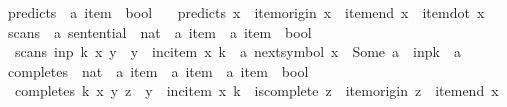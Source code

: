 %
\begin{isabellebody}%
%
%
\isadelimtheory
%
\endisadelimtheory
%
\isatagtheory
%
\endisatagtheory
{\isafoldtheory}%
%
\isadelimtheory
%
\endisadelimtheory
%
\isadelimdocument
%
\endisadelimdocument
%
\isatagdocument
%
\isamarkuptrue%
%
\isamarkuptrue%
%
\isamarkuptrue%
%
\endisatagdocument
{\isafolddocument}%
%
\isadelimdocument
%
\endisadelimdocument
{}\isamarkupfalse%
\ predicts\ {\isacharcolon}{\kern0pt}{\isacharcolon}{\kern0pt}\ {\isachardoublequoteopen}{\isacharprime}{\kern0pt}a\ item\ {\isasymRightarrow}\ bool{\isachardoublequoteclose}\ \isanewline
\ \ {\isachardoublequoteopen}predicts\ x\ {\isasymequiv}\ item{\isacharunderscore}{\kern0pt}origin\ x\ {\isacharequal}{\kern0pt}\ item{\isacharunderscore}{\kern0pt}end\ x\ {\isasymand}\ item{\isacharunderscore}{\kern0pt}dot\ x\ {\isacharequal}{\kern0pt}\ {}{\isachardoublequoteclose}\isanewline
\isanewline
{}\isamarkupfalse%
\ scans\ {\isacharcolon}{\kern0pt}{\isacharcolon}{\kern0pt}\ {\isachardoublequoteopen}{\isacharprime}{\kern0pt}a\ sentential\ {\isasymRightarrow}\ nat\ {\isasymRightarrow}\ {\isacharprime}{\kern0pt}a\ item\ {\isasymRightarrow}\ {\isacharprime}{\kern0pt}a\ item\ {\isasymRightarrow}\ bool{\isachardoublequoteclose}\ \isanewline
\ \ {\isachardoublequoteopen}scans\ inp\ k\ x\ y\ {\isasymequiv}\ y\ {\isacharequal}{\kern0pt}\ inc{\isacharunderscore}{\kern0pt}item\ x\ k\ {\isasymand}\ {\isacharparenleft}{\kern0pt}{\isasymexists}a{\isachardot}{\kern0pt}\ next{\isacharunderscore}{\kern0pt}symbol\ x\ {\isacharequal}{\kern0pt}\ Some\ a\ {\isasymand}\ inp{\isacharbang}{\kern0pt}{\isacharparenleft}{\kern0pt}k{\isacharminus}{\kern0pt}{}{\isacharparenright}{\kern0pt}\ {\isacharequal}{\kern0pt}\ a{\isacharparenright}{\kern0pt}{\isachardoublequoteclose}\isanewline
\isanewline
{}\isamarkupfalse%
\ completes\ {\isacharcolon}{\kern0pt}{\isacharcolon}{\kern0pt}\ {\isachardoublequoteopen}nat\ {\isasymRightarrow}\ {\isacharprime}{\kern0pt}a\ item\ {\isasymRightarrow}\ {\isacharprime}{\kern0pt}a\ item\ {\isasymRightarrow}\ {\isacharprime}{\kern0pt}a\ item\ {\isasymRightarrow}\ bool{\isachardoublequoteclose}\ \isanewline
\ \ {\isachardoublequoteopen}completes\ k\ x\ y\ z\ {\isasymequiv}\ y\ {\isacharequal}{\kern0pt}\ inc{\isacharunderscore}{\kern0pt}item\ x\ k\ {\isasymand}\ is{\isacharunderscore}{\kern0pt}complete\ z\ {\isasymand}\ item{\isacharunderscore}{\kern0pt}origin\ z\ {\isacharequal}{\kern0pt}\ item{\isacharunderscore}{\kern0pt}end\ x\ {\isasymand}\isanewline

\end{isabellebody}
